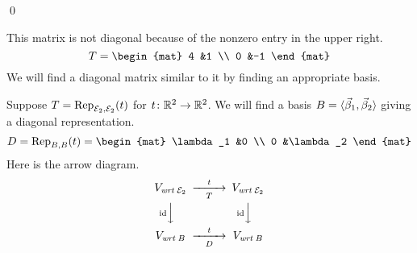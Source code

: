 \documentclass[10pt,t]{beamer}
\begin{document}
\begin{frame}
\lm[lm:DiagIffBasisOfEigens]

\pause
\pf
{}  
\qed
\end{frame}

\begin{frame}
\ex
This matrix is not diagonal because of the nonzero entry in the upper right.
\begin{equation*}
  T=
  \begin{mat}
    4  &1  \\
    0  &-1
  \end{mat}
\end{equation*}
We will find a diagonal matrix similar to it by finding an appropriate basis.

\pause
Suppose $T=\rep{t}{\stdbasis_2,\stdbasis_2}$ for $\map{t}{\Re^2}{\Re^2}$.
We will find a basis $B=\sequence{\vec{\beta}_1,\vec{\beta}_2}$ giving a 
diagonal representation.
\begin{equation*}
  D=\rep{t}{B,B}=
  \begin{mat}
    \lambda_1  &0 \\
    0    &\lambda_2
  \end{mat}
\end{equation*}
Here is the arrow diagram.
\begin{equation*}
  \begin{CD}
    V_{\wrt{\stdbasis_2}}            @>t>T>        V_{\wrt{\stdbasis_2}}       \\
    @V{\scriptstyle\identity} VV              @V{\scriptstyle\identity} VV \\
    V_{\wrt{B}}                   @>t>D>        V_{\wrt{B}}
  \end{CD}
\end{equation*}
\end{frame}
\end{document}
